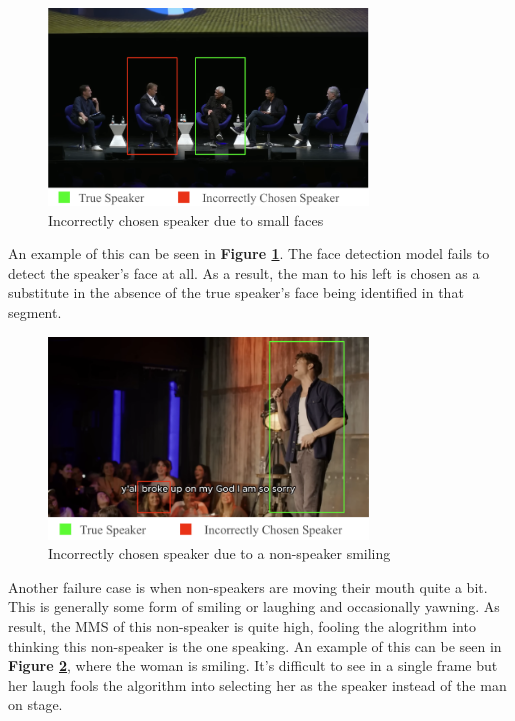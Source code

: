 \documentclass{article}
\begin{document}
\begin{figure}[htb]
\begin{minipage}[b]{1.0\linewidth}
    \centering
    \centerline{\includegraphics[width=8.5cm]{small-faces.png}}
    \medskip
\end{minipage}
\caption{Incorrectly chosen speaker due to small faces}
\label{fig:small-faces}
\end{figure}

An example of this can be seen in \textbf{Figure \ref{fig:small-faces}}. The face detection model fails to detect the speaker's face at all. As a result, the man to his left is chosen as a substitute in the absence of the true speaker's face being identified in that segment.

\begin{figure}[htb]
\begin{minipage}[b]{1.0\linewidth}
    \centering
    \centerline{\includegraphics[width=8.5cm]{smiling-face.png}}
    \medskip
\end{minipage}
\caption{Incorrectly chosen speaker due to a non-speaker smiling}
\label{fig:smiling-face}
\end{figure}

Another failure case is when non-speakers are moving their mouth quite a bit. This is generally some form of smiling or laughing and occasionally yawning. As result, the MMS of this non-speaker is quite high, fooling the alogrithm into thinking this non-speaker is the one speaking. An example of this can be seen in \textbf{Figure \ref{fig:smiling-face}}, where the woman is smiling. It's difficult to see in a single frame but her laugh fools the algorithm into selecting her as the speaker instead of the man on stage.
\end{document}
